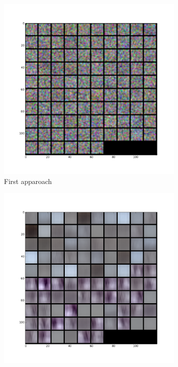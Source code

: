 \begin{figure}[ht]
\centering
\begin{subfigure}{0.33\textwidth}
\centering
\includegraphics[width=0.9\linewidth]{images/regression/conv1_26_135000.png}
\caption{First apparoach}
\end{subfigure}%
\begin{subfigure}{0.33\textwidth}
\centering
\includegraphics[width=0.9\linewidth]{images/regression/conv1_37_135000.png}

\end{subfigure}
\end{figure}
